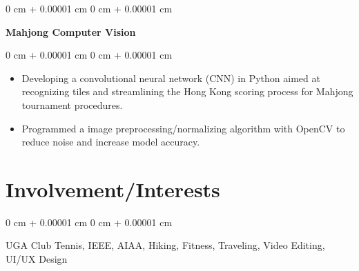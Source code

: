 \documentclass[10pt, letterpaper]{article}
\newenvironment{highlights}{
    \begin{itemize}[
        topsep=0.10 cm,
        parsep=0.10 cm,
        partopsep=0pt,
        itemsep=0pt,
        leftmargin=0 cm + 10pt
    ]
}{
    \end{itemize}
} %
\newenvironment{onecolentry}{
    \begin{adjustwidth}{
        0 cm + 0.00001 cm
    }{
        0 cm + 0.00001 cm
    }
}{
    \end{adjustwidth}
} %
\newenvironment{twocolentry}[2][]{
    \onecolentry
    \def\secondColumn{#2}
    \setcolumnwidth{\fill, 4.5 cm}
    \begin{paracol}{2}
}{
    \switchcolumn \raggedleft \secondColumn
    \end{paracol}
    \endonecolentry
} %
\begin{document}
        \vspace{0.2 cm}
        \begin{twocolentry}{
            
        }      
\textbf{Mahjong Computer Vision}
\end{twocolentry}

        \begin{onecolentry}
            \begin{highlights}
                \item 
Developing a convolutional neural network (CNN) in Python aimed at recognizing tiles and streamlining the Hong Kong scoring process for Mahjong tournament procedures.

                \item Programmed a image preprocessing/normalizing algorithm with OpenCV to reduce noise and increase model accuracy.
            \end{highlights}
        \end{onecolentry}
        

\section{Involvement/Interests}

\begin{onecolentry}
    UGA Club Tennis, IEEE, AIAA, Hiking, Fitness, Traveling, Video Editing, UI/UX Design
\end{onecolentry}
    
    

    
\end{document}
